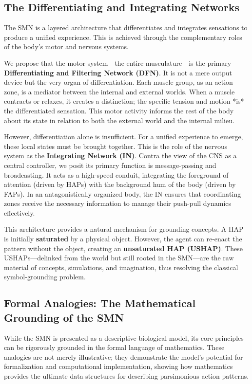 \subsection{The Differentiating and Integrating Networks}
\label{subsec:networks}
The SMN is a layered architecture that differentiates and integrates sensations to produce a unified experience. This is achieved through the complementary roles of the body's motor and nervous systems.

We propose that the motor system—the entire musculature—is the primary \textbf{Differentiating and Filtering Network (DFN)}. It is not a mere output device but the very organ of differentiation. Each muscle group, as an action zone, is a mediator between the internal and external worlds. When a muscle contracts or relaxes, it creates a distinction; the specific tension and motion *is* the differentiated sensation. This motor activity informs the rest of the body about its state in relation to both the external world and the internal milieu.

However, differentiation alone is insufficient. For a unified experience to emerge, these local states must be brought together. This is the role of the nervous system as the \textbf{Integrating Network (IN)}. Contra the view of the CNS as a central controller, we posit its primary function is message-passing and broadcasting. It acts as a high-speed conduit, integrating the foreground of attention (driven by HAPs) with the background hum of the body (driven by FAPs). In an antagonistically organized body, the IN ensures that coordinating zones receive the necessary information to manage their push-pull dynamics effectively.

This architecture provides a natural mechanism for grounding concepts. A HAP is initially \textbf{saturated} by a physical object. However, the agent can re-enact the pattern without the object, creating an \textbf{unsaturated HAP (USHAP)}. These USHAPs—delinked from the world but still rooted in the SMN—are the raw material of concepts, simulations, and imagination, thus resolving the classical symbol-grounding problem.

\subsection{Formal Analogies: The Mathematical Grounding of the SMN}
\label{subsec:formal_analogies}
While the SMN is presented as a descriptive biological model, its core principles can be rigorously grounded in the formal language of mathematics. These analogies are not merely illustrative; they demonstrate the model's potential for formalization and computational implementation, showing how mathematics provides the ultimate data structures for describing parsimonious action patterns.

